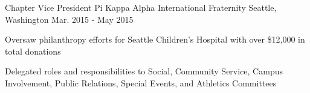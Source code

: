 

\begin{cventries}

  \cventry
    {Chapter Vice President} %
    {Pi Kappa Alpha International Fraternity} %
    {Seattle, Washington} %
    {Mar. 2015 - May 2015} %
    {
      \begin{cvitems} %
        \item {Oversaw philanthropy efforts for Seattle Children’s Hospital with over \$12,000 in total donations}
        \item {Delegated roles and responsibilities to Social, Community Service, Campus Involvement, Public Relations, Special Events, and Athletics Committees}
      \end{cvitems}
    }
\end{cventries}
